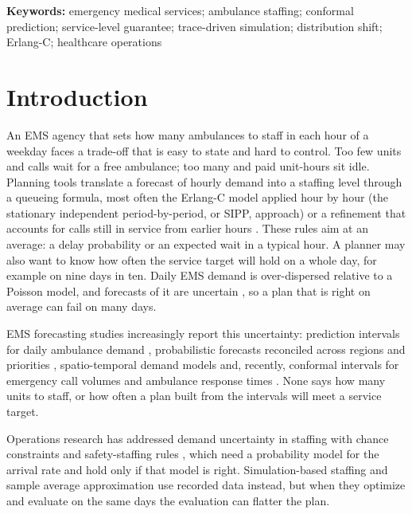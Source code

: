 \documentclass[12pt]{article}
\begin{document}
\medskip\noindent\textbf{Keywords:} %
emergency medical services; ambulance staffing; conformal prediction; service-level guarantee; trace-driven simulation; distribution shift; Erlang-C; healthcare operations

\clearpage

\section{Introduction}

An EMS agency that sets how many ambulances to staff in each hour of a weekday faces a trade-off that is easy to state and hard to control. Too few units and calls wait for a free ambulance; too many and paid unit-hours sit idle. Planning tools translate a forecast of hourly demand into a staffing level through a queueing formula, most often the Erlang-C model applied hour by hour (the stationary independent period-by-period, or SIPP, approach) or a refinement that accounts for calls still in service from earlier hours \citep{green2001improving,jennings1996server,green2007coping,feldman2008staffing,defraeye2016staffing}. These rules aim at an average: a delay probability or an expected wait in a typical hour. A planner may also want to know how often the service target will hold on a whole day, for example on nine days in ten. Daily EMS demand is over-dispersed relative to a Poisson model, and forecasts of it are uncertain \citep{channouf2007application,matteson2011forecasting,steckley2009forecast}, so a plan that is right on average can fail on many days.

EMS forecasting studies increasingly report this uncertainty: prediction intervals for daily ambulance demand \citep{monks2023forecasting}, probabilistic forecasts reconciled across regions and priorities \citep{rostamitabar2024hierarchical}, spatio-temporal demand models \citep{matteson2011forecasting,zhou2015spatio} and, recently, conformal intervals for emergency call volumes \citep{kara2026beyond} and ambulance response times \citep{mappouras2026process}. None says how many units to staff, or how often a plan built from the intervals will meet a service target.

Operations research has addressed demand uncertainty in staffing with chance constraints and safety-staffing rules \citep{gurvich2010staffing,bassamboo2010capacity,gans2015parametric}, which need a probability model for the arrival rate and hold only if that model is right. Simulation-based staffing \citep{atlason2004call} and sample average approximation \citep{kleywegt2002saa} use recorded data instead, but when they optimize and evaluate on the same days the evaluation can flatter the plan.
\end{document}

